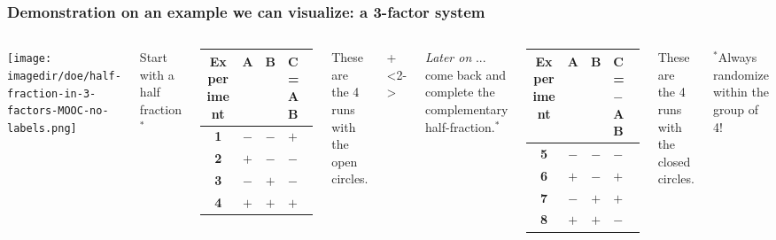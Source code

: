 \documentclass[handout,11pt,aspectratio=169,mathserif]{beamer}
\begin{document}
\begin{frame}\frametitle{Demonstration on an example we can visualize: a 3-factor system}
	\begin{columns}
			\begin{center}
				\texttt{[image: \\imagedir/doe/half-fraction-in-3-factors-MOOC-no-labels.png]}
			\end{center}
			
		
			{\color{blue}Start with a half fraction $^\ast$}
			\begin{tabulary}{\linewidth}{cccl}\hline 
				\textsf{\relax Experiment } & \textbf{\relax A } & \textbf{\relax B } & \textbf{\relax C = AB} \\
				\hline 
				\textbf{1} & \(-\) & \(-\) & \(+\) \\
				\textbf{2} & \(+\) & \(-\) & \(-\) \\
				\textbf{3} & \(-\) & \(+\) & \(-\) \\
				\textbf{4} & \(+\) & \(+\) & \(+\) \\  \hline
			\end{tabulary}
			
			{\color{myOrange}These are the 4 runs with the open circles.}

			\small
			\vspace{0.5cm}
			
			
			\onslide+<2->{
			{\color{blue}\emph{Later on} ... come back and complete the complementary half-fraction.$^\ast$}
			
			\begin{tabulary}{\linewidth}{cccl}\hline 
				\textsf{\relax Experiment } & \textbf{\relax A } & \textbf{\relax B } & \textbf{\relax C = $-$AB } \\
				\hline 
				\textbf{5} & \(-\) & \(-\) & \(-\) \\
				\textbf{6} & \(+\) & \(-\) & \(+\) \\
				\textbf{7} & \(-\) & \(+\) & \(+\) \\
				\textbf{8} & \(+\) & \(+\) & \(-\) \\ \hline
			\end{tabulary}
			
			{\color{myOrange}These are the 4 runs with the closed circles.}
			}
			
			\vspace{6pt}
			{\color{blue}$^\ast$\scriptsize {Always randomize within the group of 4!}}
	\end{columns}
\end{frame}
\end{document}
